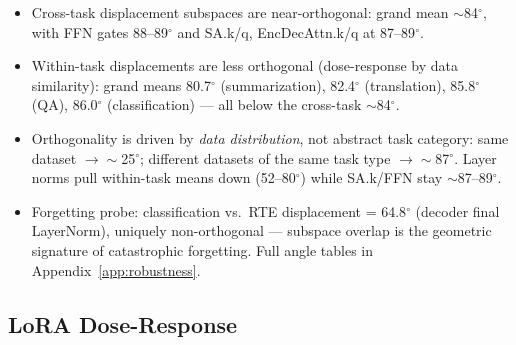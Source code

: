 \documentclass{article}
\begin{document}
\begin{itemize}
  \item Cross-task displacement subspaces are near-orthogonal: grand mean $\sim$84$^\circ$, with
    FFN gates 88--89$^\circ$ and SA.k/q, EncDecAttn.k/q at 87--89$^\circ$.
  \item Within-task displacements are less orthogonal (dose-response by data similarity): grand
    means 80.7$^\circ$ (summarization), 82.4$^\circ$ (translation), 85.8$^\circ$ (QA),
    86.0$^\circ$ (classification) --- all below the cross-task $\sim$84$^\circ$.
  \item Orthogonality is driven by \emph{data distribution}, not abstract task category: same
    dataset $\to \sim$25$^\circ$; different datasets of the same task type $\to \sim$87$^\circ$.
    Layer norms pull within-task means down (52--80$^\circ$) while SA.k/FFN stay $\sim$87--89$^\circ$.
  \item Forgetting probe: classification vs.\ RTE displacement = 64.8$^\circ$ (decoder final
    LayerNorm), uniquely non-orthogonal --- subspace overlap is the geometric signature of
    catastrophic forgetting. Full angle tables in Appendix~\ref{app:robustness}.
\end{itemize}


\subsection{LoRA Dose-Response}
\label{sec:results:lora}
\end{document}
